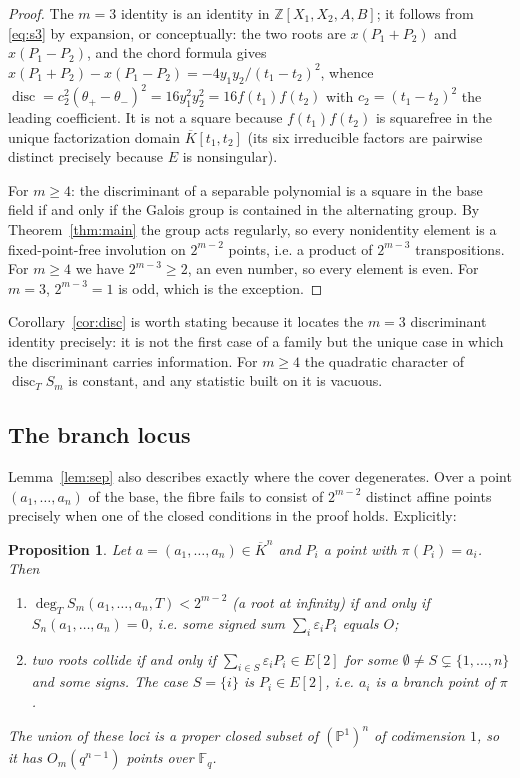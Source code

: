 \documentclass[11pt,a4paper]{article}
\theoremstyle{plain}
\newtheorem{proposition}[theorem]{Proposition}
\theoremstyle{definition}
\DeclareMathOperator{\disc}{disc}
\newcommand{\PP}{\mathbb{P}}
\newcommand{\FF}{\mathbb{F}}
\newcommand{\ZZ}{\mathbb{Z}}
\newcommand{\Fq}{\FF_q}
\newcommand{\eps}{\varepsilon}
\begin{document}
\begin{proof}
The $m=3$ identity is an identity in $\ZZ[X_1,X_2,A,B]$; it follows from
\eqref{eq:s3} by expansion, or conceptually: the two roots are
$x(P_1 + P_2)$ and $x(P_1 - P_2)$, and the chord formula gives
$x(P_1+P_2) - x(P_1-P_2) = -4y_1y_2/(t_1-t_2)^2$, whence
$\disc = c_2^2 (\theta_+ - \theta_-)^2 = 16 y_1^2 y_2^2 = 16 f(t_1)f(t_2)$ with
$c_2 = (t_1-t_2)^2$ the leading coefficient. It is not a square because
$f(t_1)f(t_2)$ is squarefree in the unique factorization domain
$\overline{K}[t_1,t_2]$ (its six irreducible factors are pairwise distinct
precisely because $E$ is nonsingular).

For $m \ge 4$: the discriminant of a separable polynomial is a square in the base
field if and only if the Galois group is contained in the alternating group. By
Theorem~\ref{thm:main} the group acts regularly, so every nonidentity element is a
fixed-point-free involution on $2^{m-2}$ points, i.e. a product of $2^{m-3}$
transpositions. For $m \ge 4$ we have $2^{m-3} \ge 2$, an even number, so every
element is even. For $m = 3$, $2^{m-3} = 1$ is odd, which is the exception.
\end{proof}

Corollary~\ref{cor:disc} is worth stating because it locates the $m=3$
discriminant identity precisely: it is not the first case of a family but the
unique case in which the discriminant carries information. For $m \ge 4$ the
quadratic character of $\disc_T S_m$ is constant, and any statistic built on it is
vacuous.

\subsection{The branch locus}\label{sec:branch}

Lemma~\ref{lem:sep} also describes exactly where the cover degenerates. Over a
point $(a_1,\dots,a_n)$ of the base, the fibre fails to consist of $2^{m-2}$
distinct affine points precisely when one of the closed conditions in the proof
holds. Explicitly:

\begin{proposition}\label{prop:branch}
Let $a = (a_1,\dots,a_n) \in \overline{K}^n$ and $P_i$ a point with
$\pi(P_i) = a_i$. Then
\begin{enumerate}
\item $\deg_T S_m(a_1,\dots,a_n,T) < 2^{m-2}$ (a root at infinity) if and only if
  $S_{n}(a_1,\dots,a_n) = 0$, i.e. some signed sum $\sum_i \eps_i P_i$ equals $O$;
\item two roots collide if and only if $\sum_{i \in S} \eps_i P_i \in E[2]$ for
  some $\emptyset \neq S \subsetneq \{1,\dots,n\}$ and some signs. The case
  $S = \{i\}$ is $P_i \in E[2]$, i.e. $a_i$ is a branch point of $\pi$.
\end{enumerate}
The union of these loci is a proper closed subset of $(\PP^1)^n$ of codimension
$1$, so it has $O_m(q^{n-1})$ points over $\Fq$.
\end{proposition}
\end{document}
